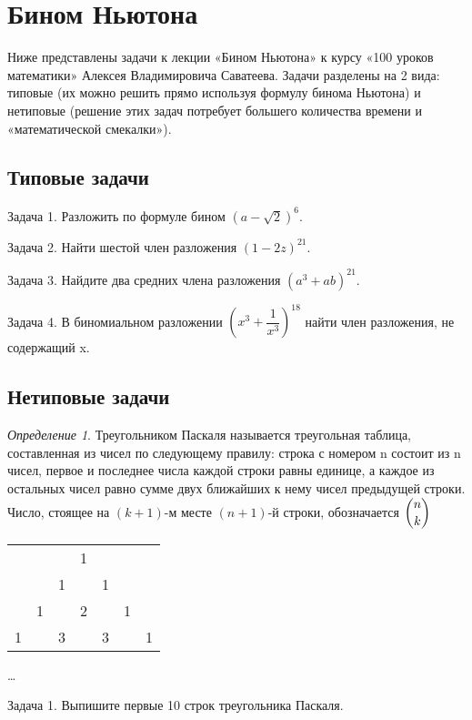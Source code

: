 \documentclass[12pt]{article}
\begin{document}
\section*{Бином Ньютона}

Ниже представлены задачи к лекции «Бином Ньютона» к курсу «100 уроков математики» Алексея Владимировича Саватеева. 
Задачи разделены на 2 вида: типовые (их можно решить прямо используя формулу бинома Ньютона) и нетиповые (решение этих задач потребует большего количества времени и «математической смекалки»).

\subsection*{Типовые задачи}

Задача 1. Разложить по формуле бином $(a-\sqrt{2})^6$.

Задача 2. Найти шестой член разложения $(1-2z)^{21}$.

Задача 3. Найдите два средних члена разложения $(a^3+ab)^{21}$.

Задача 4. В биномиальном разложении $\left(x^3+\dfrac{1}{x^3} \right)^{18}$ найти член разложения, не содержащий x.

\subsection*{Нетиповые задачи}

\textit{Определение 1}. Треугольником Паскаля называется треугольная таблица, составленная из чисел по следующему правилу: строка с номером n состоит из n чисел, первое и последнее числа каждой строки равны единице, а каждое из остальных чисел равно сумме двух ближайших к нему чисел предыдущей строки. Число, стоящее на $(k +1)$-м месте $(n+1)$-й строки, обозначается $\dbinom{n}{k}$

	\begin{table}[h]
		\begin{center}
		\begin{tabular}{lllllll}
			&  &  & 1 &  &  &  \\
			&  & 1 &  & 1 &  &  \\
			& 1 &  & 2 &  & 1 &  \\
			1 &  & 3 &  & 3 &  & 1
		\end{tabular}

	\dots
	\end{center}
	\end{table}

Задача 1. Выпишите первые 10 строк треугольника Паскаля.
\end{document}

